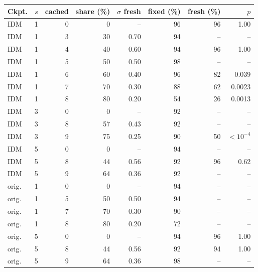 \begin{tabular}{@{}lrrrrrrr@{}}
\toprule
Ckpt. & $s$ & cached & share (\%) & $\sigma$ fresh & fixed (\%) & fresh (\%) & $p$ \\
\midrule
IDM & 1 & 0 & 0 & -- & 96 & 96 & 1.00 \\
IDM & 1 & 3 & 30 & 0.70 & 94 & -- & -- \\
IDM & 1 & 4 & 40 & 0.60 & 94 & 96 & 1.00 \\
IDM & 1 & 5 & 50 & 0.50 & 98 & -- & -- \\
IDM & 1 & 6 & 60 & 0.40 & 96 & 82 & 0.039 \\
IDM & 1 & 7 & 70 & 0.30 & 88 & 62 & 0.0023 \\
IDM & 1 & 8 & 80 & 0.20 & 54 & 26 & 0.0013 \\
IDM & 3 & 0 & 0 & -- & 92 & -- & -- \\
IDM & 3 & 8 & 57 & 0.43 & 92 & -- & -- \\
IDM & 3 & 9 & 75 & 0.25 & 90 & 50 & $<10^{-4}$ \\
IDM & 5 & 0 & 0 & -- & 94 & -- & -- \\
IDM & 5 & 8 & 44 & 0.56 & 92 & 96 & 0.62 \\
IDM & 5 & 9 & 64 & 0.36 & 92 & -- & -- \\
orig. & 1 & 0 & 0 & -- & 94 & -- & -- \\
orig. & 1 & 5 & 50 & 0.50 & 94 & -- & -- \\
orig. & 1 & 7 & 70 & 0.30 & 90 & -- & -- \\
orig. & 1 & 8 & 80 & 0.20 & 72 & -- & -- \\
orig. & 5 & 0 & 0 & -- & 94 & 96 & 1.00 \\
orig. & 5 & 8 & 44 & 0.56 & 92 & 94 & 1.00 \\
orig. & 5 & 9 & 64 & 0.36 & 98 & -- & -- \\
\bottomrule
\end{tabular}
